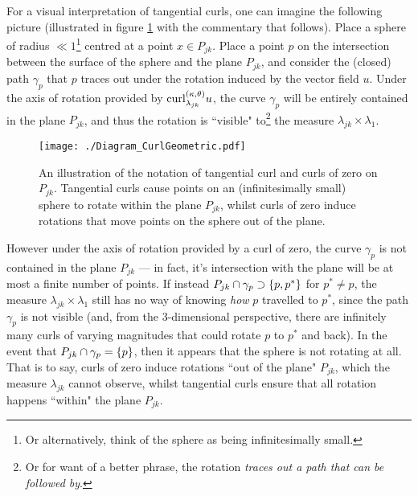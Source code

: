 For a visual interpretation of tangential curls, one can imagine the following picture (illustrated in figure \ref{fig:Diagram_CurlGeometric} with the commentary that follows).
Place a sphere of radius $\ll 1$\footnote{Or alternatively, think of the sphere as being infinitesimally small.} centred at a point $x\in P_{jk}$.
Place a point $p$ on the intersection between the surface of the sphere and the plane $P_{jk}$, and consider the (closed) path $\gamma_p$ that $p$ traces out under the rotation induced by the vector field $u$.
Under the axis of rotation provided by $\mathrm{curl}_{\lambda_{jk}}^{\left( \kappa, \theta \right)}u$, the curve $\gamma_p$ will be entirely contained in the plane $P_{jk}$, and thus the rotation is ``visible" to\footnote{Or for want of a better phrase, the rotation \emph{traces out a path that can be followed by}.} the measure $\lambda_{jk}\times\lambda_1$.
\begin{figure}[b!]
	\centering
	\texttt{[image: ./Diagram\_CurlGeometric.pdf]}
	\caption[Geometric interpretation of tangential curls with respect to $\dddmes$.]{\label{fig:Diagram_CurlGeometric} An illustration of the notation of tangential curl and curls of zero on $P_{jk}$. Tangential curls cause points on an (infinitesimally small) sphere to rotate within the plane $P_{jk}$, whilst curls of zero induce rotations that move points on the sphere out of the plane.}
\end{figure}
However under the axis of rotation provided by a curl of zero, the curve $\gamma_p$ is not contained in the plane $P_{jk}$ --- in fact, it's intersection with the plane will be at most a finite number of points.
If instead $P_{jk}\cap\gamma_p\supset\left\{ p,p^* \right\}$ for $p^*\neq p$, the measure $\lambda_{jk}\times\lambda_1$ still has no way of knowing \emph{how} $p$ travelled to $p^*$, since the path $\gamma_p$ is not visible (and, from the 3-dimensional perspective, there are infinitely many curls of varying magnitudes that could rotate $p$ to $p^*$ and back).
In the event that $P_{jk}\cap\gamma_p=\left\{ p \right\}$, then it appears that the sphere is not rotating at all.
That is to say, curls of zero induce rotations ``out of the plane" $P_{jk}$, which the measure $\lambda_{jk}$ cannot observe, whilst tangential curls ensure that all rotation happens ``within" the plane $P_{jk}$.

